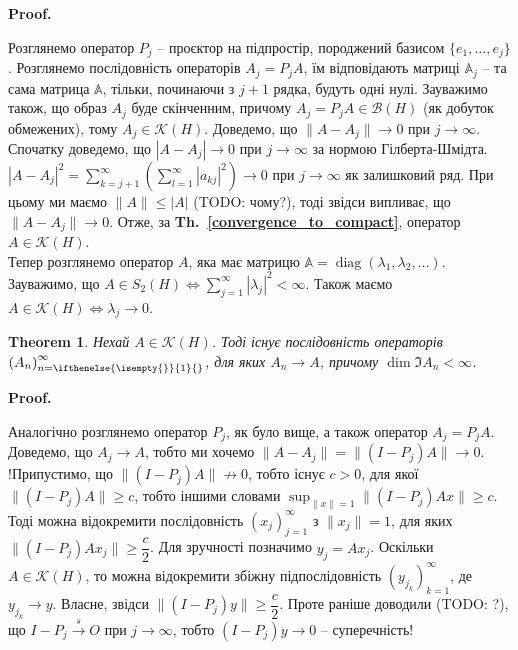 \documentclass[a4paper, 10pt]{article}
\makeatletter
\theoremstyle{theoremdd}
\newtheorem{theorem}{Theorem}[subsection]
\theoremstyle{theoremdd}
\theoremstyle{theoremdd}
\theoremstyle{theoremdd}
\theoremstyle{theoremdd}
\theoremstyle{theoremdd}
\theoremstyle{theoremdd}
\theoremstyle{theoremdd}
\newcommand\thref[1]{\textbf{Th.~\ref{#1}}}
\newcommand{\tostrong}{\overset{s}{\to}}
\newcommand{\sequence}[2][]{\left({#2}\right)_{n=\ifthenelse{\isempty{#1}}{1}{#1}}^{\infty}}
\renewenvironment{proof}[1][Proof.\\]{\par
\pushQED{\hfill \qed}%
\normalfont \topsep6\p@\@plus6\p@\relax
\trivlist
\item\relax
{\bfseries
#1\@addpunct{.}}\hspace\labelsep\ignorespaces
}{%
\popQED\endtrivlist\@endpefalse
}
\DeclareMathOperator{\diag}{diag}
\makeatother
\begin{document}
\begin{proof}
Розглянемо оператор $P_j$ -- проєктор на підпростір, породжений базисом $\{e_1,\dots,e_j\}$. Розглянемо послідовність операторів $A_j = P_j A$, їм відповідають матриці $\mathbb{A}_j$ -- та сама матрица $\mathbb{A}$, тільки, починаючи з $j+1$ рядка, будуть одні нулі. Зауважимо також, що образ $A_j$ буде скінченним, причому $A_j = P_j A \in \mathcal{B}(H)$ (як добуток обмежених), тому $A_j \in \mathcal{K}(H)$. Доведемо, що $\|A - A_j\| \to 0$ при $j \to \infty$.\\
Спочатку доведемо, що $|A-A_j| \to 0$ при $j \to \infty$ за нормою Гілберта-Шмідта.\\
$|A-A_j|^2 = \displaystyle\sum_{k=j+1}^\infty \left( \sum_{l=1}^\infty |a_{kj}|^2 \right) \to 0$ при $j \to \infty$ як залишковий ряд. При цьому ми маємо $\|A\| \leq |A|$ (TODO: чому?), тоді звідси випливає, що $\|A-A_j\| \to 0$. Отже, за \thref{convergence_to_compact}, оператор $A \in \mathcal{K}(H)$.
\bigskip \\
Тепер розглянемо оператор $A$, яка має матрицю $\mathbb{A} = \diag\left(\lambda_1,\lambda_2,\dots\right)$. Зауважимо, що $A \in S_2(H) \iff \displaystyle\sum_{j=1}^\infty |\lambda_j|^2 <\infty$. Також маємо $A \in \mathcal{K}(H) \iff \lambda_j \to 0$.
\end{proof}

\begin{theorem}
Нехай $A \in \mathcal{K}(H)$. Тоді існує послідовність операторів $\sequence{A_n}$, для яких $A_n \to A$, причому $\dim \Im A_n < \infty$.
\end{theorem}

\begin{proof}
Аналогічно розглянемо оператор $P_j$, як було вище, а також оператор $A_j = P_j A$. Доведемо, що $A_j \to A$, тобто ми хочемо $\|A - A_j\| = \|(I-P_j) A\| \to 0$.\\
!Припустимо, що $\|(I-P_j)A \| \not\to 0$, тобто існує $c > 0$, для якої $\|(I - P_j) A\| \geq c$, тобто іншими словами $\displaystyle\sup_{\|x\| = 1} \|(I-P_j)A x \| \geq c$. Тоді можна відокремити послідовність $(x_j)_{j=1}^\infty$ з $\|x_j\| = 1$, для яких $\|(I-P_j) Ax_j\| \geq \dfrac{c}{2}$. Для зручності позначимо $y_j = Ax_j$. Оскільки $A \in \mathcal{K}(H)$, то можна відокремити збіжну підпослідовність $(y_{j_k})_{k=1}^\infty$, де $y_{j_k} \to y$. Власне, звідси $\|(I-P_j) y\| \geq \dfrac{c}{2}$. Проте раніше доводили (TODO: ?), що $I-P_j \tostrong O$ при $j \to \infty$, тобто $(I-P_j)y \to 0$ -- суперечність!
\end{proof}
\end{document}
